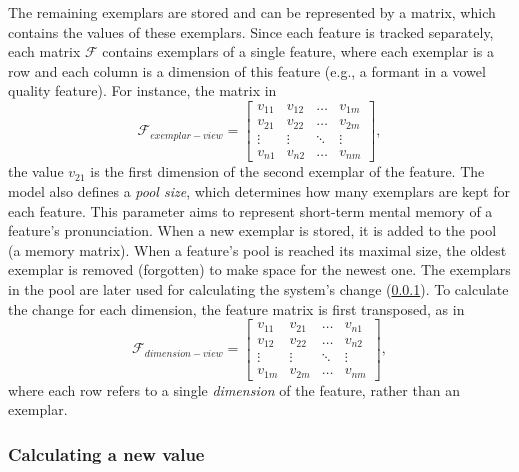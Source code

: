 The remaining exemplars are stored and can be represented by a matrix, which contains the values of these exemplars.
Since each feature is tracked separately, each matrix $\mathcal{F}$ contains exemplars of a single feature, where each exemplar is a row and each column is a dimension of this feature (e.g., a formant in a vowel quality feature).
For instance, the matrix in
%
\begin{equation}
	\label{eq:feature_matrix}
	\mathcal{F}_{exemplar-view} =
	\begin{bmatrix} 
		v_{11} & v_{12} & \dots  & v_{1m}\\
		v_{21} & v_{22} & \dots  & v_{2m}\\
		\vdots & \vdots & \ddots & \vdots\\
		v_{n1} & v_{n2} & \dots  & v_{nm} 
	\end{bmatrix},
\end{equation}
\noindent
%
the value $v_{21}$ is the first dimension of the second exemplar of the feature.
The model also defines a \textit{pool size}, which determines how many exemplars are kept for each feature.
This parameter aims to represent short-term mental memory of a feature's pronunciation.
When a new exemplar is stored, it is added to the pool (a memory matrix).
When a feature's pool is reached its maximal size, the oldest exemplar is removed (forgotten) to make space for the newest one.
The exemplars in the pool are later used for calculating the system's change (\cref{subsubsec:calculating_changed_value}).
To calculate the change for each dimension, the feature matrix is first transposed, as in
%
\begin{equation}
	\label{eq:transposed_feature_matrix}
	\textbf{$\mathcal{F}_{dimension-view}$} =
	\begin{bmatrix} 
		v_{11} & v_{21} & \dots  & v_{n1}\\
		v_{12} & v_{22} & \dots  & v_{n2} \\
		\vdots & \vdots & \ddots & \vdots \\
		v_{1m} & v_{2m} & \dots  & v_{nm} 
	\end{bmatrix},
\end{equation}
\noindent
%
where each row refers to a single \emph{dimension} of the feature, rather than an exemplar.

\subsubsection{Calculating a new value}
\label{subsubsec:calculating_changed_value}

